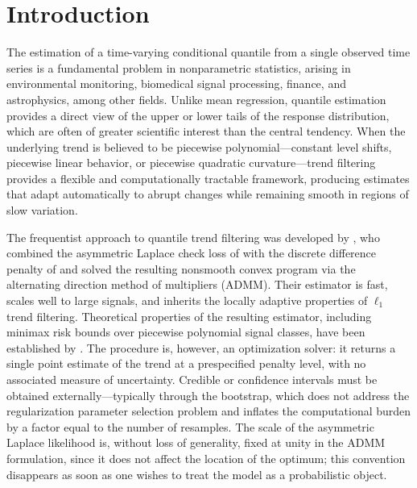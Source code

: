 \section{Introduction}
\label{sec:introduction}

The estimation of a time-varying conditional quantile from a single observed time series is a fundamental problem in nonparametric statistics, arising in environmental monitoring, biomedical signal processing, finance, and astrophysics, among other fields. Unlike mean regression, quantile estimation provides a direct view of the upper or lower tails of the response distribution, which are often of greater scientific interest than the central tendency. When the underlying trend is believed to be piecewise polynomial---constant level shifts, piecewise linear behavior, or piecewise quadratic curvature---trend filtering provides a flexible and computationally tractable framework, producing estimates that adapt automatically to abrupt changes while remaining smooth in regions of slow variation.

The frequentist approach to quantile trend filtering was developed by \citet{brantley2020baseline}, who combined the asymmetric Laplace check loss of \citet{koenker1978regression} with the discrete difference penalty of \citet{tibshirani2014adaptive} and solved the resulting nonsmooth convex program via the alternating direction method of multipliers (ADMM). Their estimator is fast, scales well to large signals, and inherits the locally adaptive properties of $\ell_1$ trend filtering. Theoretical properties of the resulting estimator, including minimax risk bounds over piecewise polynomial signal classes, have been established by \citet{madrid2022risk}. The procedure is, however, an optimization solver: it returns a single point estimate of the trend at a prespecified penalty level, with no associated measure of uncertainty. Credible or confidence intervals must be obtained externally---typically through the bootstrap, which does not address the regularization parameter selection problem and inflates the computational burden by a factor equal to the number of resamples. The scale of the asymmetric Laplace likelihood is, without loss of generality, fixed at unity in the ADMM formulation, since it does not affect the location of the optimum; this convention disappears as soon as one wishes to treat the model as a probabilistic object.

